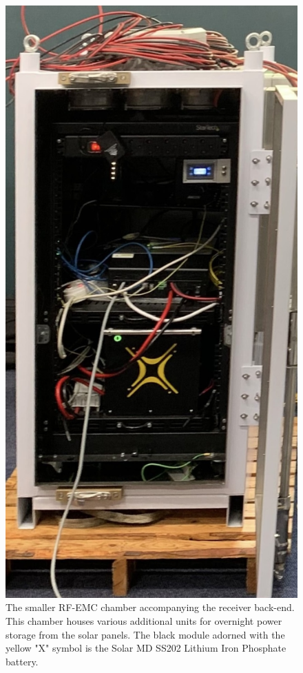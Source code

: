 \begin{figure}
    \centering
    \includegraphics[scale=0.2]{power_chamber.jpeg}
    \caption{The smaller RF-EMC chamber accompanying the receiver back-end. This chamber houses various additional units for overnight power storage from the solar panels. The black module adorned with the yellow "X" symbol is the Solar MD SS202 Lithium Iron Phosphate battery.}
    \label{fig:power_chamber}
\end{figure}


